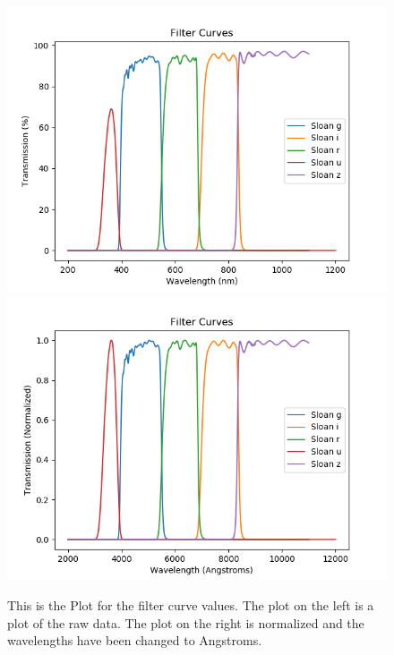 \documentclass[12pt]{article}
\begin{document}
\begin{center}
\begin{figure}[H]
\label{Filter_Curves}
\includegraphics[scale=0.5]{Filter_curves.png}
\includegraphics[scale=0.5]{Filter_curves_norm.png}
\caption{This is the Plot for the filter curve values. The  plot on the left is a plot of the raw data. The plot on the right is normalized and the wavelengths have been changed to Angstroms.}
\end{figure}
\end{center}
\end{document}
